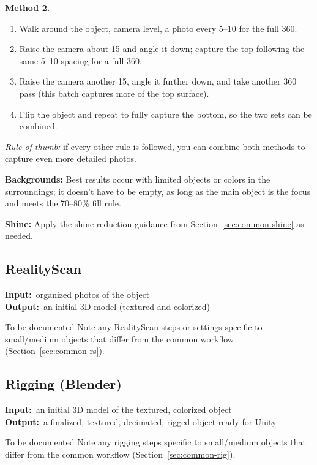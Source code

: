 \documentclass[11pt]{article}
\newcommand{\inout}[2]{%
    \begin{stageio}%
    \textbf{Input:}~#1\\[2pt]%
    \textbf{Output:}~#2%
    \end{stageio}%
}
\begin{document}
\textbf{Method 2.}
\begin{enumerate}[leftmargin=1.6em]
  \item Walk around the object, camera level, a photo every 5--10\textdegree{} for the full 360\textdegree.
  \item Raise the camera about 15\textdegree{} and angle it down; capture the top following the same 5--10\textdegree{} spacing for a full 360\textdegree.
  \item Raise the camera another 15\textdegree{}, angle it further down, and take another 360\textdegree{} pass (this batch captures more of the top surface).
  \item Flip the object and repeat to fully capture the bottom, so the two sets can be combined.
\end{enumerate}

\noindent\textit{Rule of thumb:} if every other rule is followed, you can combine both methods to capture even more detailed photos.

\textbf{Backgrounds:} Best results occur with limited objects or colors in the surroundings; it doesn't have to be empty, as long as the main object is the focus and meets the 70--80\% fill rule.

\textbf{Shine:} Apply the shine-reduction guidance from Section~\ref{sec:common-shine} as needed.

\subsection{RealityScan}
\inout{organized photos of the object}{an initial 3D model (textured and colorized)}
\begin{todobox}{To be documented}
Note any RealityScan steps or settings specific to small/medium objects that differ from the common workflow (Section~\ref{sec:common-rs}).
\end{todobox}

\subsection{Rigging (Blender)}
\inout{an initial 3D model of the textured, colorized object}{a finalized, textured, decimated, rigged object ready for Unity}
\begin{todobox}{To be documented}
Note any rigging steps specific to small/medium objects that differ from the common workflow (Section~\ref{sec:common-rig}).
\end{todobox}
\end{document}
